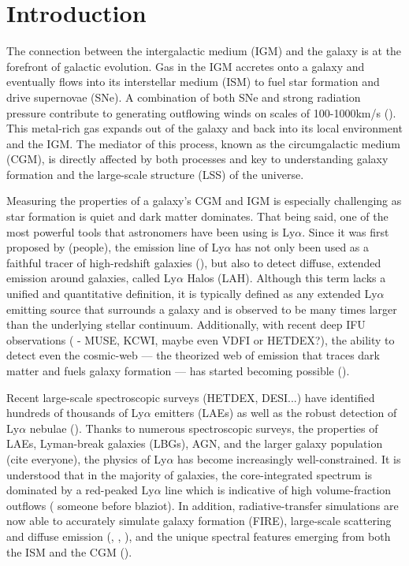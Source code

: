 \documentclass[linenumbers,amsmath,trackchanges,preprint2]{aastex702}
\begin{document}
\section{Introduction}
\par The connection between the intergalactic medium (IGM) and the galaxy is at the forefront of galactic evolution. Gas in the IGM accretes onto a galaxy and eventually flows into its interstellar medium (ISM) to fuel star formation and drive supernovae (SNe). A combination of both SNe and strong radiation pressure contribute to generating outflowing winds on scales of 100-1000km/s (\cite{?}). This metal-rich gas expands out of the galaxy and back into its local environment and the IGM. The mediator of this process, known as the circumgalactic medium (CGM), is directly affected by both processes and key to understanding galaxy formation and the large-scale structure (LSS) of the universe.
\par Measuring the properties of a galaxy's CGM and IGM is especially challenging as star formation is quiet and dark matter dominates. That being said, one of the most powerful tools that astronomers have been using is Ly$\alpha$. Since it was first proposed by (people), the emission line of Ly$\alpha$ has not only been used as a faithful tracer of high-redshift galaxies (\cite{?}), but also to detect diffuse, extended emission around galaxies, called Ly$\alpha$ Halos (LAH). Although this term lacks a unified and quantitative definition, it is typically defined as any extended Ly$\alpha$ emitting source that surrounds a galaxy and is observed to be many times larger than the underlying stellar continuum. Additionally, with recent deep IFU observations (\cite{?} - MUSE, KCWI, maybe even VDFI or HETDEX?), the ability to detect even the cosmic-web --- the theorized web of emission that traces dark matter and fuels galaxy formation --- has started becoming possible (\cite{tornotti2025}).
\par Recent large-scale spectroscopic surveys (HETDEX, DESI...) have identified hundreds of thousands of Ly$\alpha$ emitters (LAEs) as well as the robust detection of Ly$\alpha$ nebulae (\cite{cooper2026}). Thanks to numerous spectroscopic surveys, the properties of LAEs, Lyman-break galaxies (LBGs), AGN, and the larger galaxy population (cite everyone), the physics of Ly$\alpha$ has become increasingly well-constrained. It is understood that in the majority of galaxies, the core-integrated spectrum is dominated by a red-peaked Ly$\alpha$ line which is indicative of high volume-fraction outflows (\cite{?} someone before blaziot). In addition, radiative-transfer simulations are now able to accurately simulate galaxy formation (FIRE), large-scale scattering and diffuse emission (\cite{lake2015}, \cite{byrohl2021}, \cite{byrohl2023}), and the unique spectral features emerging from both the ISM and the CGM (\cite{blaizot2023}). 
\end{document}
